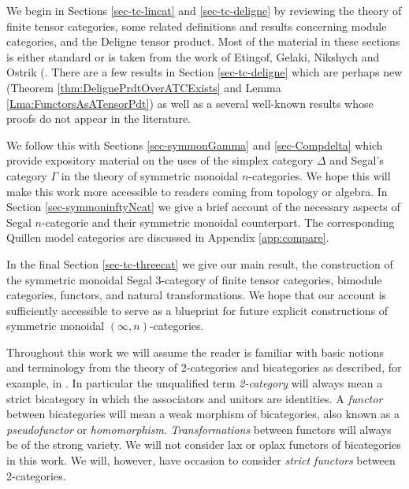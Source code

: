 \documentclass{amsart}
\begin{document}
We begin in Sections \ref{sec-tc-lincat} and \ref{sec-tc-deligne} by reviewing the theory of finite tensor categories, some related definitions and results concerning module categories, and the Deligne tensor product.  Most of the material in these sections is either standard or is taken from the work of Etingof, Gelaki, Nikshych and Ostrik (\cite{MR1976459,MR2183279,MR2097289, 0909.3140, EGNO}.  There are a few results in Section \ref{sec-tc-deligne} which are perhaps new (Theorem \ref{thm:DelignePrdtOverATCExists} and Lemma \ref{Lma:FunctorsAsATensorPdt}) as well as a several well-known results whose proofs do not appear in the literature. 

We follow this with Sections \ref{sec-symmonGamma} and \ref{sec-Compdelta} which provide expository material on the uses of the simplex category $\Delta$ and Segal's category $\Gamma$ in the theory of symmetric monoidal $n$-categories. We hope this will make this work more accessible to readers coming from topology or algebra. In Section \ref{sec-symmoninftyNcat} we give a brief account of the necessary aspects of Segal $n$-categorie and their symmetric monoidal counterpart. The corresponding Quillen model categories are discussed in Appendix \ref{app:compare}.

In the final Section \ref{sec-tc-threecat} we give our main result, the construction of the symmetric monoidal Segal 3-category of finite tensor categories,  bimodule categories, functors, and natural transformations. We hope that our account is sufficiently accessible to serve as a blueprint for future explicit constructions of  symmetric monoidal $(\infty,n)$-categories. 


Throughout this work we will assume the reader is familiar with basic notions and terminology from the theory of 2-categories and bicategories as described, for example, in \cite{math.CT/9810017}. In particular the unqualified term {\em 2-category} will always mean a strict bicategory in which the associators and unitors are identities. A {\em functor} between bicategories will mean a weak morphism of bicategories, also known as a {\em pseudofunctor} or {\em homomorphism}. {\em Transformations} between functors will always be of the strong variety. We will not consider lax or oplax functors of bicategories in this work. We will, however, have occasion to consider {\em strict functors} between 2-categories. 
\end{document}
